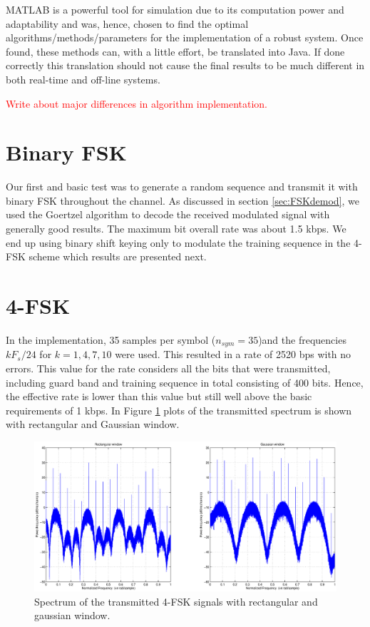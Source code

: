 \documentclass[12pt,a4paper,openright]{report}
\begin{document}
MATLAB is a powerful tool for simulation due to its computation power and adaptability and was, hence, chosen to find the optimal algorithms/methods/parameters for the implementation of a robust system. Once found, these methods can, with a little effort, be translated into Java. If done correctly this translation should not cause the final results to be much different in both real-time and off-line systems. 

\textcolor{red}{Write about major differences in algorithm implementation.}%

\section{Binary FSK}
Our first and basic test was to generate a random sequence and transmit it with binary FSK throughout the channel. As discussed in section \ref{sec:FSKdemod}, we used the Goertzel algorithm to decode the received modulated signal with generally good results. The maximum bit overall rate was about 1.5 kbps. We end up using binary shift keying only to modulate the training sequence in the 4-FSK scheme which results are presented next. 


\section{4-FSK}

In the implementation, 35 samples per symbol ($n_{sym}=35$)and the frequencies \(kF_s/24\) for \(k=1,4,7,10\) were used. This resulted in a rate of 2520 bps with no errors.  This value for the rate considers all the bits that were transmitted, including guard band and training sequence in total consisting of 400 bits. Hence, the effective rate is lower than this value but still well above the basic requirements of 1 kbps. 
In Figure \ref{fig:4FSKspectrum} plots of the transmitted spectrum is shown with rectangular and Gaussian window. 

\begin{figure}[H]
  \centering
    \includegraphics[width=1.0\textwidth]{4FSKspectrum_windoweffect.eps}
    \caption[4-FSK spectrum]{Spectrum of the transmitted 4-FSK signals with rectangular and gaussian window.}
    \label{fig:4FSKspectrum}
\end{figure}
\end{document}
